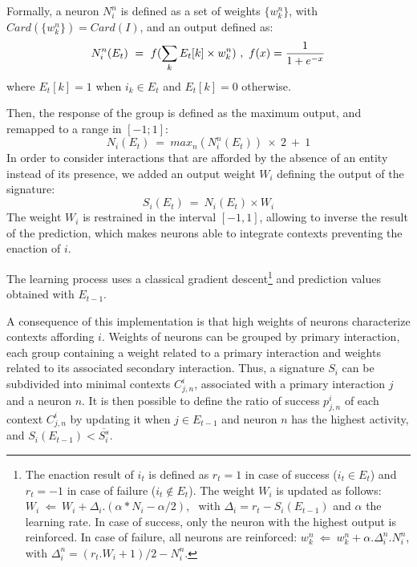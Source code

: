 \documentclass[conference]{IEEEtran}
\begin{document}
Formally, a neuron $N_i^n$ is defined as a set of weights $\{w_k^n\}$, with $Card(\{w_k^n\})=Card(I)$, and an output defined as:
\begin{equation}
N_i^n(E_t)~=~f(\sum_{k} E_t[k] \times w_k^n)~,~ f(x) = { {1}\over{1+e^{-x} }}
\end{equation}
where $E_t[k]=1$ when $i_k \in E_t$ and $E_t[k]=0$ otherwise.

Then, the response of the group is defined as the maximum output, and remapped to a range in $[-1;1]$:
\begin{equation}
N_i(E_t)~=~max_n (N_i^n(E_t) ) \: \times \: 2 ~+~ 1
\end{equation}
In order to consider interactions that are afforded by the absence of an entity instead of its presence, we added an output weight $W_i$ defining the output of the signature:
\begin{equation}
S_i(E_t)~=~N_i(E_t) \times W_i
\end{equation}
The weight $W_i$ is restrained in the interval $[-1,1]$, allowing to inverse the result of the prediction, which makes neurons able to integrate contexts preventing the enaction of $i$.

The learning process uses a classical gradient descent\footnote{The enaction result of $i_t$ is defined as $r_t=1$ in case of success ($i_t \in E_t$) and $r_t=-1$ in case of failure ($i_t \not\in E_t$).
The weight $W_i$ is updated as follows:
$W_i ~\Leftarrow~ W_i+ \Delta_i . (\alpha * N_i - \alpha /2)$, ~with $\Delta_i = r_t - S_i(E_{t-1})$
and $\alpha$ the learning rate.
In case of success, only the neuron with the highest output is reinforced.
In case of failure, all neurons are reinforced:
$w_k^n ~\Leftarrow~ w_k^n+ \alpha . \Delta_i^n . N_i^n$,
with $\Delta_i^n=(r_t.W_i + 1)/2 - N_i^n$.}
and prediction values obtained with $E_{t-1}$.

A consequence of this implementation is that high weights of neurons characterize contexts affording $i$.
Weights of neurons can be grouped by primary interaction, each group containing a weight related to a primary interaction and weights related to its associated secondary interaction. 
Thus, a signature $S_i$ can be subdivided into minimal contexts $C_{j,n}^i$, associated with a primary interaction $j$ and a neuron $n$. 
It is then possible to define the ratio of success $p_{j,n}^i$ of each context $C_{j,n}^i$ by updating it when $j \in E_{t-1}$ and neuron $n$ has the highest activity, and $S_i(E_{t-1})<\overline{S_i^s}$.
\end{document}

